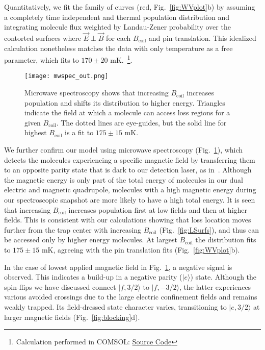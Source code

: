 \documentclass[%
 reprint,
 amsmath,amssymb,
 aps,
prl,
]{revtex4-1}
\newcommand{\bcl}{{$B_\text{coil}$}}
\newcommand{\epb}{{$\vec{E}\!\perp\!\vec{B}$}}
\begin{document}
Quantitatively, we fit the family of curves (red, Fig.~\ref{fig:WVplot}b) by assuming a completely time independent and thermal population distribution and integrating molecule flux weighted by Landau-Zener probability over the contorted surfaces where \epb{} for each \bcl{} and pin translation.
This idealized calculation nonetheless matches the data with only temperature as a free parameter, which fits to $170\pm20\text{ mK}$.~\footnote{Calculation performed in COMSOL: \href{https://github.com/dreens/spin-flip-integration/}{Source Code}}.

\begin{figure}[tb]
\texttt{[image: mwspec\_out.png]}%
\caption{
Microwave spectroscopy shows that increasing \bcl{} increases population and shifts its distribution to higher energy. 
Triangles indicate the field at which a molecule can access loss regions for a given \bcl. 
The dotted lines are eye-guides, but the solid line for highest \bcl{} is a fit to $175\pm15\text{ mK}$.
\label{fig:spec}}
\end{figure}

We further confirm our model using microwave spectroscopy (Fig.~\ref{fig:spec}), which detects the molecules experiencing a specific magnetic field by transferring them to an opposite parity state that is dark to our detection laser, as in~\cite{Stuhl2012evap}.
Although the magnetic energy is only part of the total energy of molecules in our dual electric and magnetic quadrupole, molecules with a high magnetic energy during our spectroscopic snapshot are more likely to have a high total energy. 
It is seen that increasing \bcl{} increases population first at low fields and then at higher fields. 
This is consistent with our calculations showing that loss location moves further from the trap center with increasing \bcl{} (Fig.~\ref{fig:LSurfs}), and thus can be accessed only by higher energy molecules. 
At largest \bcl{} the distribution fits to $175\pm15\text{ mK}$, agreeing with the pin translation fits (Fig.~\ref{fig:WVplot}b).

In the case of lowest applied magnetic field in Fig.~\ref{fig:spec}, a negative signal is observed. 
This indicates a build-up in a negative parity ($|e\rangle$) state. 
Although the spin-flips we have discussed connect $|f,3/2\rangle$ to $|f,-3/2\rangle$, the latter experiences various avoided crossings due to the large electric confinement fields and remains weakly trapped.  
Its field-dressed state character varies, transitioning to $|e,3/2\rangle$ at larger magnetic fields (Fig.~\ref{fig:blocking}d). 
\end{document}
